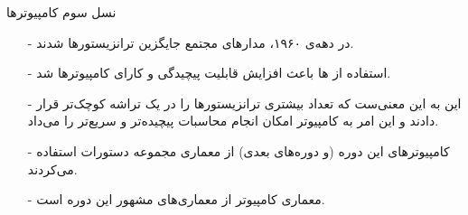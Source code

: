 \begin{frame}{نسل سوم کامپیوتر‌ها}
\begin{itemize}\itemr
\item[-]
در دهه‌ی ۱۹۶۰، مدار‌های مجتمع 
جایگزین ترانزیستور‌ها شدند.
\item[-]
استفاده از ها باعث افزایش قابلیت پیچیدگی و کارای کامپیوتر‌ها شد.
\item[-]
این به این معنی‌ست که تعداد بیشتری ترانزیستور‌ها را در یک تراشه کوچک‌تر قرار دادند و این امر به کامپیوتر امکان انجام محاسبات پیچیده‌تر و سریع‌تر را می‌داد.
\item[-]
کامپیوتر‌های این دوره (و دوره‌‌های بعدی) از معماری مجموعه دستورات 
استفاده می‌کردند.
\item[-]
معماری کامپیوتر 
از معماری‌های مشهور این دوره است.
\end{itemize}
\end{frame}
